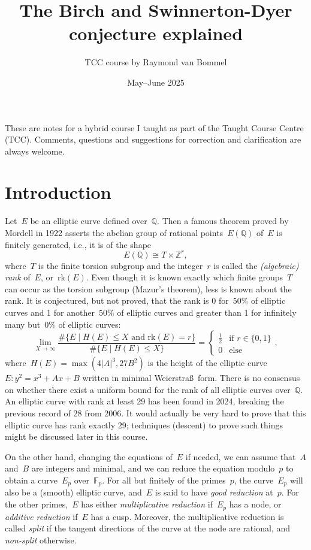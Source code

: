 \documentclass[12pt]{article}
\title{The Birch and Swinnerton-Dyer conjecture explained}
\author{TCC course by Raymond van Bommel}
\date{May--June 2025}
\theoremstyle{definition}
\numberwithin{equation}{subsection}
\newcommand{\Q}{\ensuremath{\mathbb{Q}}}
\newcommand{\Z}{\ensuremath{\mathbb{Z}}}
\newcommand{\F}{\ensuremath{\mathbb{F}}}
\begin{document}
\maketitle

These are notes for a hybrid course I taught as part of the Taught Course Centre (TCC).
Comments, questions and suggestions for correction and clarification are always welcome. 


\setcounter{tocdepth}{1}
\tableofcontents

\section{Introduction}

Let~$E$ be an elliptic curve defined over~$\Q$.
Then a famous theorem proved by Mordell in 1922 asserts the abelian group of rational points~$E(\Q)$ of~$E$ is finitely generated, i.e., it is of the shape
$$E(\Q) \cong T \times \Z^r,$$
where~$T$ is the finite torsion subgroup and the integer~$r$ is called the {\em (algebraic) rank} of~$E$, or~$\mathrm{rk}(E)$.
Even though it is known exactly which finite groups~$T$ can occur as the torsion subgroup (Mazur's theorem), less is known about the rank. It is conjectured, but not proved, that the rank is 0 for~$50\%$ of elliptic curves and 1 for another~$50\%$ of elliptic curves and greater than 1 for infinitely many but~$0\%$ of elliptic curves:
$$\lim_{X \to \infty} \frac{\#\{ E \mid H(E) \leq X \textrm{ and } \mathrm{rk}(E) = r \}}{\#\{ E \mid H(E) \leq X\}} = \begin{cases}\tfrac12 &\textrm{if } r \in \{0 , 1\}\\ 0 &\textrm{else}\end{cases},$$
where~$H(E) = \max(4|A|^3, 27B^2)$ is the height of the elliptic curve~$E \colon y^2 = x^3 + Ax + B$ written in minimal Weierstra\ss\ form.
There is no consensus on whether there exist a uniform bound for the rank of all elliptic curves over~$\Q$.
An elliptic curve with rank at least 29 has been found in 2024, breaking the previous record of 28 from 2006.
It would actually be very hard to prove that this elliptic curve has rank exactly 29; techniques (descent) to prove such things might be discussed later in this course.

On the other hand, changing the equations of~$E$ if needed, we can assume that~$A$ and~$B$ are integers and minimal, and we can reduce the equation modulo~$p$ to obtain a curve~$E_p$ over~$\F_p$.
For all but finitely of the primes~$p$, the curve~$E_p$ will also be a (smooth) elliptic curve, and~$E$ is said to have {\em good reduction} at~$p$.
For the other primes,~$E$ has either {\em multiplicative reduction} if~$E_p$ has a node, or {\em additive reduction} if~$E$ has a cusp.
Moreover, the multiplicative reduction is called {\em split} if the tangent directions of the curve at the node are rational, and {\em non-split} otherwise.
\end{document}
